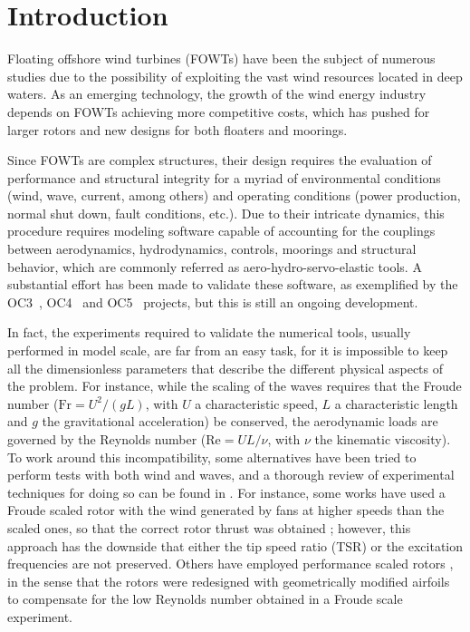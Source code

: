 \section{Introduction} \label{sec:introduction}
Floating offshore wind turbines (FOWTs) have been the subject of numerous studies due to the possibility of exploiting the vast wind resources located in deep waters. As an emerging technology, the growth of the wind energy industry depends on FOWTs achieving more competitive costs, which has pushed for larger rotors and new designs for both floaters and moorings.

Since FOWTs are complex structures, their design requires the evaluation of performance and structural integrity for a myriad of environmental conditions (wind, wave, current, among others) and operating conditions (power production, normal shut down, fault conditions, etc.). Due to their intricate dynamics, this procedure requires modeling software capable of accounting for the couplings between aerodynamics, hydrodynamics, controls, moorings and structural behavior, which are commonly referred as aero-hydro-servo-elastic tools. A substantial effort has been made to validate these software, as exemplified by the OC3~\citep{jonkman2010report}, OC4~\citep{OC42014} and OC5~\citep{OC52017} projects, but this is still an ongoing development.

In fact, the experiments required to validate the numerical tools, usually performed in model scale, are far from an easy task, for it is impossible to keep all the dimensionless parameters that describe the different physical aspects of the problem. For instance, while the scaling of the waves requires that the Froude number ($\textrm{Fr} = U^{2}/(gL)$, with $U$ a characteristic speed, $L$ a characteristic length and $g$ the gravitational acceleration) be conserved, the aerodynamic loads are governed by the Reynolds number ($\textrm{Re} = UL/\nu$, with $\nu$ the kinematic viscosity). To work around this incompatibility, some alternatives have been tried to perform tests with both wind and waves, and a thorough review of experimental techniques for doing so can be found in \citet{otter2022review}. For instance, some works have used a Froude scaled rotor with  the wind generated by fans at higher speeds than the scaled ones, so that the correct rotor thrust was obtained \citep{martin2014methodology, skaare2007integrated, mortensen2018experimental}; however, this approach has the downside that either the tip speed ratio (TSR) or the excitation frequencies are not preserved. Others have employed performance scaled rotors \citep{goupee2014experimental, de2014development, bredmose2017triple}, in the sense that the rotors were redesigned with geometrically modified airfoils to compensate for the low Reynolds number obtained in a Froude scale experiment. 

